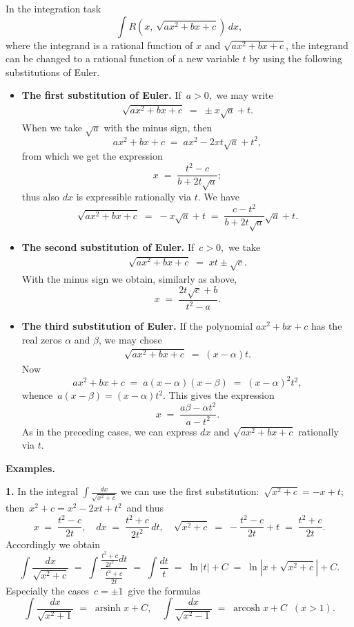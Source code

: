 \documentclass[12pt]{article}
\DeclareMathOperator{\arsinh}{arsinh}
\DeclareMathOperator{\arcosh}{arcosh}
\begin{document}
In the integration task
               $$\int\!R(x,\,\sqrt{ax^2+bx+c})\,dx,$$
where the integrand is a rational function of $x$ and $\sqrt{ax^2+bx+c}$, the integrand can be changed to a rational function of a new variable $t$ by using the following substitutions of Euler.

\begin{itemize}

\item \textbf{The first substitution of Euler.}\; If\, $a > 0$,\, we may write
\begin{align}
               \sqrt{ax^2+bx+c} \;=\; \pm x\sqrt{a}+t.
\end{align}
When we take $\sqrt{a}$ with the minus sign, then
$$ax^2+bx+c \;=\; ax^2-2xt\sqrt{a}+t^2,$$
from which we get the expression
$$x \;=\; \frac{t^2-c}{b+2t\sqrt{a}};$$
thus also $dx$ is expressible rationally via $t$.  We have
$$\sqrt{ax^2+bx+c} \;=\; -x\sqrt{a}+t \;=\; \frac{c-t^2}{b+2t\sqrt{a}}\sqrt{a}+t.$$

\item \textbf{The second substitution of Euler.}\; If\, $c > 0$,\, we take
\begin{align}
                \sqrt{ax^2+bx+c} \;=\; xt\pm\sqrt{c}.
\end{align}
With the minus sign we obtain, similarly as above,
$$x \;=\; \frac{2t\sqrt{c}+b}{t^2-a}.$$

\item \textbf{The third substitution of Euler.}\; If the polynomial $ax^2\!+\!bx\!+\!c$ has the real zeros $\alpha$ and $\beta$, we may chose
\begin{align}
\sqrt{ax^2\!+\!bx\!+\!c} \;=\; (x\!-\!\alpha)t.
\end{align}
Now
$$ax^2\!+\!bx\!+\!c \;=\; a(x\!-\!\alpha)(x\!-\!\beta) \;=\; (x\!-\!\alpha)^2t^2,$$
whence\, $a(x\!-\!\beta) = (x\!-\!\alpha)t^2$.  This gives the expression
$$x \;=\; \frac{a\beta\!-\!\alpha t^2}{a\!-\!t^2}.$$
As in the preceding cases, we can express $dx$ and $\sqrt{ax^2\!+\!bx\!+\!c}$ rationally via $t$.

\end{itemize}

\textbf{Examples.}

\textbf{1.}  In the integral $\displaystyle\int\!\frac{dx}{\sqrt{x^2+c}}$ we can use the first substitution:\, $\sqrt{x^2+c} = -x+t$;\, then\, $x^2+c = x^2-2xt+t^2$\, and thus
$$x \;=\; \frac{t^2-c}{2t},\quad dx \;=\; \frac{t^2+c}{2t^2}\,dt,\quad \sqrt{x^2+c} \;=\; -\frac{t^2-c}{2t}+t \;=\; \frac{t^2+c}{2t}.$$
Accordingly we obtain
$$\int\!\frac{dx}{\sqrt{x^2+c}} \;=\; \int\!\frac{\frac{t^2+c}{2t^2}dt}{\frac{t^2+c}{2t}} \;=\; \int\!\frac{dt}{t} 
\;=\; \ln|t|+C \;=\; \ln|x+\sqrt{x^2+c}|+C.$$
Especially the cases \,$c = \pm1$\, give the formulas
$$\int\!\frac{dx}{\sqrt{x^2+1}} \;=\; \arsinh{x}+C,  \quad \int\!\frac{dx}{\sqrt{x^2-1}} \;=\; \arcosh{x}+C \;\; 
(x > 1).$$ 
\end{document}
